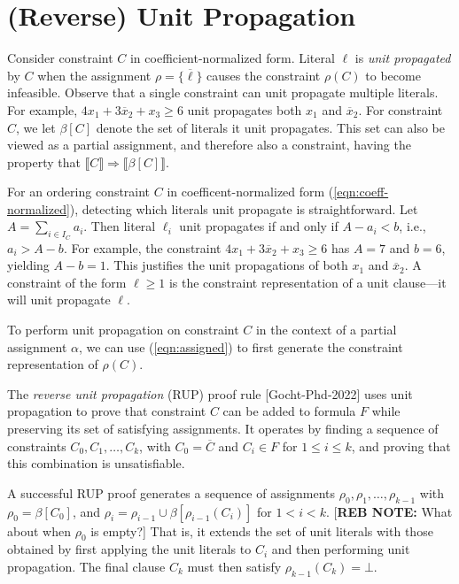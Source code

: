 \documentclass{easychair}
\newcommand{\nil}{\bot}
\renewcommand{\obar}[1]{\overline{#1}}
\newcommand{\lit}{\ell}
\newcommand{\assign}{\rho}
\newcommand{\indices}{I}
\newcommand{\uprop}[1]{\beta[#1]}
\newcommand{\imply}{\Rightarrow}
\newcommand{\func}[1]{\llbracket#1\rrbracket}
\begin{document}
\section{(Reverse) Unit Propagation}

Consider constraint $C$ in coefficient-normalized form.  Literal
$\lit$ is {\em unit propagated} by $C$ when the assignment $\assign = \{ \obar{\lit} \}$
causes the constraint $\assign(C)$ to become infeasible.
Observe that
a single constraint can unit propagate multiple literals.  For
example, $4 x_1 + 3 \obar{x}_2 + x_3 \geq 6$ unit propagates both
$x_1$ and $\obar{x}_2$.  For constraint $C$, we let $\uprop{C}$
denote the set of literals it unit propagates.  This set can also be
viewed as a partial assignment, and therefore also a constraint,
having the property that $\func{C} \imply \func{\uprop{C}}$.

For an ordering constraint $C$ in coefficent-normalized form (\ref{eqn:coeff-normalized}), detecting
which literals unit propagate is straightforward.  Let $A =
\sum_{i \in \indices_C} a_{i}$.  Then literal $\lit_{i}$ unit propagates if and only
if $A - a_{i} < b$, i.e., $a_{i} > A - b$.  For example, the constraint 
$4 x_1 + 3 \obar{x}_2 + x_3 \geq 6$ has $A = 7$ and $b=6$, yielding $A-b=1$.
This justifies the unit propagations of both $x_1$ and $\obar{x}_2$.
A constraint of the form $\lit \geq 1$ is the constraint representation of a unit clause---it will unit propagate $\lit$.

To perform unit propagation on constraint $C$ in the context of a
partial assignment $\alpha$, we can use (\ref{eqn:assigned}) to first
generate the constraint representation of $\assign(C)$.

The {\em reverse unit propagation} (RUP) proof rule [Gocht-Phd-2022] uses
unit propagation to prove that constraint $C$ can be added to 
formula $F$ while preserving its set of satisfying assignments.  It
operates by finding a sequence of constraints $C_0, C_1, \ldots, C_k$,
with $C_0 = \obar{C}$ and $C_i \in F$ for $1 \leq i \leq k$, and proving that this combination is unsatisfiable.

A successful RUP proof generates a sequence of assignments
$\assign_0, \assign_1, \ldots, \assign_{k-1}$ with $\assign_0 = \uprop{C_0}$, and
$\assign_i = \assign_{i-1} \cup \uprop{\assign_{i-1}(C_i)}$
for $1 < i < k$. [{\bf REB NOTE:} What about when $\assign_0$ is empty?]
That is, it extends the set of unit literals with those obtained by first applying the unit literals to $C_i$ and then performing unit propagation.
The final clause $C_k$ must then satisfy $\assign_{k-1}(C_k) = \nil$.
\end{document}

